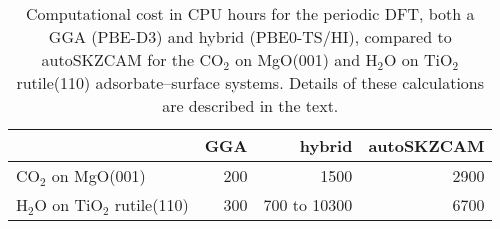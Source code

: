 \begin{table}
\caption{\label{tab:computational_cost}Computational cost in CPU hours for the periodic DFT, both a GGA (PBE-D3) and hybrid (PBE0-TS/HI), compared to autoSKZCAM for the CO$_2$ on MgO(001) and H$_2$O on TiO$_2$ rutile(110) adsorbate--surface systems. Details of these calculations are described in the text.}
\begin{tabular}{lrrr}
\toprule
 & GGA & hybrid & autoSKZCAM \\ 
\midrule
CO$_2$ on MgO(001) & 200 & 1500 & 2900 \\
H$_2$O on TiO$_2$ rutile(110) & 300 & 700 to 10300 & 6700 \\
\bottomrule
\end{tabular}
\end{table}